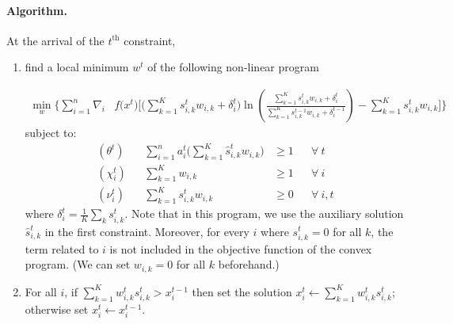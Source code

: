 \paragraph{Algorithm.}

At the arrival of the $t^{\text{th}}$ constraint,
\begin{enumerate}
	\item find a local minimum $w^t$ of the following non-linear program

\begin{align*}
\min_{w} \biggl\{\sum_{i=1}^{n}
	\nabla_{i} & f\bigl(x^{t} \bigr) \biggl[  \biggl(\sum_{k=1}^{K} s_{i,k}^{t} w_{i,k}  + \delta_{i}^{t} \biggr)
					 \ln \left(\frac{ \sum_{k=1}^{K} s_{i,k}^{t} w_{i,k}  + \delta_{i}^{t} }{\sum_{k=1}^{K} s_{i,k}^{t-1} w_{i,k} + \delta_{i}^{t-1}}\right)
									- \sum_{k=1}^{K}  s_{i,k}^{t} w_{i,k} \biggr]
		\biggr\}
\end{align*}
%
\noindent subject to:
%
\begin{align*}
    (\theta^{t})  && \sum_{i=1}^{n} a_{i}^{t} \biggl( \sum_{k=1}^{K}  \hat{s}_{i,k}^{t} w_{i,k} \biggr) &\geq 1 && \forall\ t\\
%
    (\chi_{i}^{t}) && \sum_{k=1}^{K}  w_{i,k} &\geq 1 && \forall\ i\\
%
    (\nu_{i}^{t}) && \sum_{k=1}^{K} s_{i,k}^{t} w_{i,k} &\geq 0 && \forall\ i,t
\end{align*}
%
where $\delta_{i}^{t} = \frac{1}{K} \sum_{k} s_{i,k}^{t}$.
Note that in this program, we use the auxiliary solution $\hat{s}_{i,k}^{t}$ in the first constraint.
Moreover, for every $i$ where $s_{i,k}^{t} = 0$ for all $k$, the term related to $i$ is not included in the objective function of the convex program.
(We can set $w_{i,k} = 0$ for all $k$ beforehand.)
	\item For all $i$, if $\sum_{k=1}^{K} w_{i,k}^{t} s_{i,k}^{t} > x_{i}^{t-1}$ then set the solution $x_{i}^{t} \gets \sum_{k=1}^{K} w_{i,k}^{t} s_{i,k}^{t}$;
otherwise set $x_{i}^{t} \gets x_{i}^{t-1}$.
\end{enumerate}


